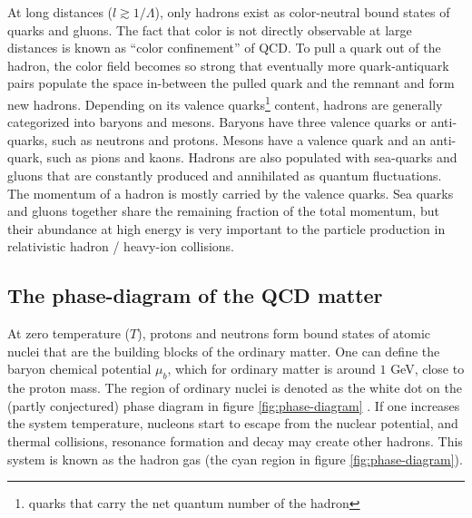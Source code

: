 At long distances ($l \gtrsim 1/\Lambda$), only hadrons exist as color-neutral bound states of quarks and gluons.
The fact that color is not directly observable at large distances is known as ``color confinement'' of QCD. 
To pull a quark out of the hadron, the color field becomes so strong that eventually more quark-antiquark pairs populate the space in-between the pulled quark and the remnant and form new hadrons.
Depending on its valence quarks\footnote{quarks that carry the net quantum number of the hadron} content, hadrons are generally categorized into baryons and mesons.
Baryons have three valence quarks or anti-quarks, such as neutrons and protons.
Mesons have a valence quark and an anti-quark, such as pions and kaons.
Hadrons are also populated with sea-quarks and gluons that are constantly produced and annihilated as quantum fluctuations.
The momentum of a hadron is mostly carried by the valence quarks.
Sea quarks and gluons together share the remaining fraction of the total momentum, but their abundance at high energy is very important to the particle production in relativistic hadron / heavy-ion collisions.

\subsection{The phase-diagram of the QCD matter}
At zero temperature ($T$), protons and neutrons form bound states of atomic nuclei that are the building blocks of the ordinary matter.
One can define the baryon chemical potential $\mu_b$, which for ordinary matter is around $1$ GeV, close to the proton mass.
The region of ordinary nuclei is denoted as the white dot on the (partly conjectured) phase diagram in figure \ref{fig:phase-diagram} \cite{Geesaman:2015fha}.
If one increases the system temperature, nucleons start to escape from the nuclear potential, and thermal collisions, resonance formation and decay may create other hadrons.
This system is known as the hadron gas (the cyan region in figure \ref{fig:phase-diagram}).


